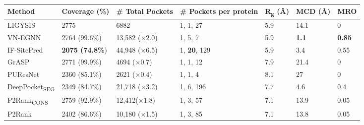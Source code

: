 \begin{landscape}
\begin{longtable}[c]{|M{28mm}|M{29mm}|M{29mm}|M{41mm}|M{26mm}|M{26mm}|M{20mm}|}
\hline
\textbf{Method}        & \textbf{Coverage} (\%)    & \textbf{\# Total Pockets}  & \textbf{\# Pockets per protein} & \textbf{R\textsubscript{g}} (\AA{}) & \textbf{MCD} (\AA{}) & \textbf{MRO}  \\ \hline
\endfirsthead
%
\endhead
%
LIGYSIS       & 2775          & 6882          & 1, 1, 27            & 5.9                              & 14.1                         & 0    \\ \hline
VN-EGNN       & 2764 (99.6\%)   & 13,582 ($\times$2.0) & 1, 5, 7             & 5.9                              & \textbf{1.1}                          & \textbf{0.85} \\ \hline
IF-SitePred   & \textbf{2075 (74.8\%}) & 44,948 ($\times$6.5) & 1, \textbf{20}, 129          & 5.9                              & 3.4                          & 0.55 \\ \hline
GrASP         & 2771 (99.9\%) & 4694 ($\times$0.7)  & 1, 1, 12            & 7.9                              & 21.4                         & 0    \\ \hline
PUResNet      & 2360 (85.1\%) & 2621 ($\times$0.4)  & 1, 1, 4             & 8.1                              & 27                           & 0    \\ \hline
DeepPocket\textsubscript{SEG} & 2349 (84.7\%) & 21,718 ($\times$3.2) & 1, 6, 196           & 7.7                              & 4.6                          & 0.4  \\ \hline
P2Rank\textsubscript{CONS}    & 2759 (92.9\%) & 12,412($\times$1.8)  & 1, 3, 57            & 7.1                              & 13.9                         & 0.05 \\ \hline
P2Rank        & 2402 (86.6\%) & 10,180 ($\times$1.5) & 1, 3, 85            & 7.1                              & 13.8                         & 0.05 \\ \hline

\end{longtable}
\end{landscape}
